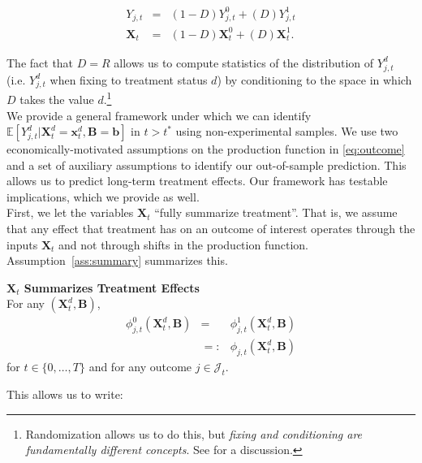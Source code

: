 \begin{eqnarray}
Y_{j,t}        &=& \left( 1 - D \right) Y_{j,t}^0    + \left( D \right) Y_{j,t}^1 \nonumber \\
\bm{X}_{t} &=& \left( 1 - D \right) \bm{X}_{t}^0 + \left( D \right) \bm{X}_{t}^1. \label{eq:countersystem}
\end{eqnarray}

\noindent The fact that $D = R$ allows us to compute statistics of the distribution of $Y_{j,t}^d$ (i.e. $Y_{j,t}^d$ when fixing to treatment status $d$) by conditioning to the space in which $D$ takes the value $d$.\footnote{Randomization allows us to do this, but \textit{fixing and conditioning are fundamentally different concepts}. See \citet{Heckman_Pinto_2015_EconometTheory} for a discussion.}\\

\noindent We provide a general framework under which we can identify $\mathbb{E} \left[ Y_{j,t}^d | \bm{X}_{t}^d = \bm{x}_t^d, \bm{B} = \bm{b}  \right]$ in $t > t^*$ using non-experimental samples. We use two economically-motivated assumptions on the production function in \eqref{eq:outcome} and a set of auxiliary assumptions to identify our out-of-sample prediction. This allows us to predict long-term treatment effects. Our framework has testable implications, which we provide as well.\\

\noindent First, we let the variables $\bm{X}_{t}$ ``fully summarize treatment''. That is, we assume that any effect that treatment has on an outcome of interest operates through the inputs $\bm{X}_{t}$ and not through shifts in the production function. Assumption~\ref{ass:summary} summarizes this.

\begin{assumption} \label{ass:summary} \textbf{$\bm{X}_{t}$ Summarizes Treatment Effects}\\
For any $\left( \bm{X}_{t}^d, \bm{B} \right)$, 
\begin{eqnarray}
\phi_{j,t}^0 \left( \bm{X}_{t}^d, \bm{B} \right) &=& \phi_{j,t}^1 \left( \bm{X}_{t}^d, \bm{B} \right) \\   \nonumber 
                                                                     &=:& \phi_{j,t} \left( \bm{X}_{t}^d, \bm{B} \right) 
\end{eqnarray}
\noindent for $t \in \{ 0, \ldots, T \}$ and for any outcome $j \in \mathcal{J}_{t}$.
\end{assumption}

\noindent This allows us to write: 

